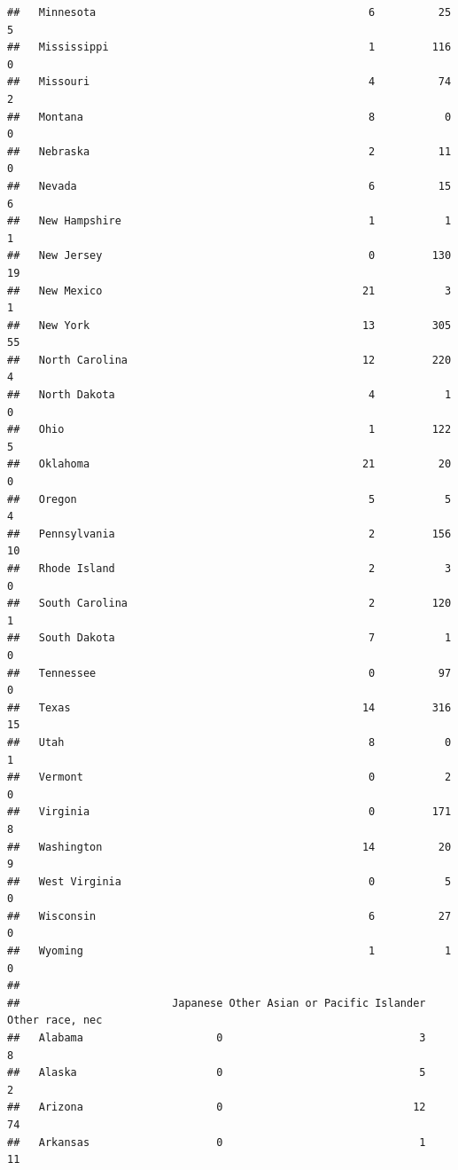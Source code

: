 \documentclass[
]{book}
\theoremstyle{definition}
\theoremstyle{definition}
\theoremstyle{definition}
\theoremstyle{remark}
\begin{document}
\begin{verbatim}
##   Minnesota                                           6          25       5
##   Mississippi                                         1         116       0
##   Missouri                                            4          74       2
##   Montana                                             8           0       0
##   Nebraska                                            2          11       0
##   Nevada                                              6          15       6
##   New Hampshire                                       1           1       1
##   New Jersey                                          0         130      19
##   New Mexico                                         21           3       1
##   New York                                           13         305      55
##   North Carolina                                     12         220       4
##   North Dakota                                        4           1       0
##   Ohio                                                1         122       5
##   Oklahoma                                           21          20       0
##   Oregon                                              5           5       4
##   Pennsylvania                                        2         156      10
##   Rhode Island                                        2           3       0
##   South Carolina                                      2         120       1
##   South Dakota                                        7           1       0
##   Tennessee                                           0          97       0
##   Texas                                              14         316      15
##   Utah                                                8           0       1
##   Vermont                                             0           2       0
##   Virginia                                            0         171       8
##   Washington                                         14          20       9
##   West Virginia                                       0           5       0
##   Wisconsin                                           6          27       0
##   Wyoming                                             1           1       0
##                       
##                        Japanese Other Asian or Pacific Islander Other race, nec
##   Alabama                     0                               3               8
##   Alaska                      0                               5               2
##   Arizona                     0                              12              74
##   Arkansas                    0                               1              11

\end{verbatim}
\end{document}
